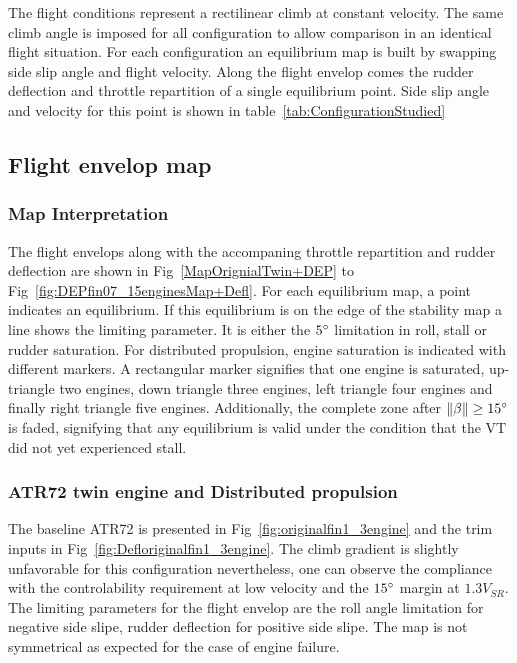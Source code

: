 The flight conditions represent a rectilinear climb at constant velocity. The same climb angle is imposed for all configuration to allow comparison in an identical flight situation.
For each configuration an equilibrium map is built by swapping side slip angle and flight velocity. Along the flight envelop comes the rudder deflection and throttle repartition of a single equilibrium point. Side slip angle and velocity for this point is shown in table~\ref{tab:ConfigurationStudied}

\clearpage
\subsection{Flight envelop map}
\subsubsection{Map Interpretation}
The flight envelops along with the accompaning throttle repartition and rudder deflection are shown in Fig~\ref{MapOrignialTwin+DEP} to Fig~\ref{fig:DEPfin07_15enginesMap+Defl}. For each equilibrium map, a point indicates an equilibrium. If this equilibrium is on the edge of the stability map a line shows the limiting parameter. It is either the $5\degree$ limitation in roll, stall or rudder saturation.
For distributed propulsion, engine saturation is indicated with different markers. A rectangular marker signifies that one engine is saturated, up-triangle two engines, down triangle three engines, left triangle four engines and finally right triangle five engines.
Additionally, the complete zone after $\|\beta\|\geq 15\degree$ is faded, signifying that any equilibrium is valid under the condition that the VT did not yet experienced stall.

\subsubsection{ATR72 twin engine and Distributed propulsion}

The baseline ATR72 is presented in Fig~\ref{fig:originalfin1_3engine} and the trim inputs in Fig~\ref{fig:Defloriginalfin1_3engine}.
The climb gradient is slightly unfavorable for this configuration nevertheless, one can observe the compliance with the controlability requirement at low velocity and the $15\degree$ margin at $1.3V_{SR}$. The limiting parameters for the flight envelop are the roll angle limitation for negative side slipe, rudder deflection for positive side slipe. The map is not symmetrical as expected for the case of engine failure.

